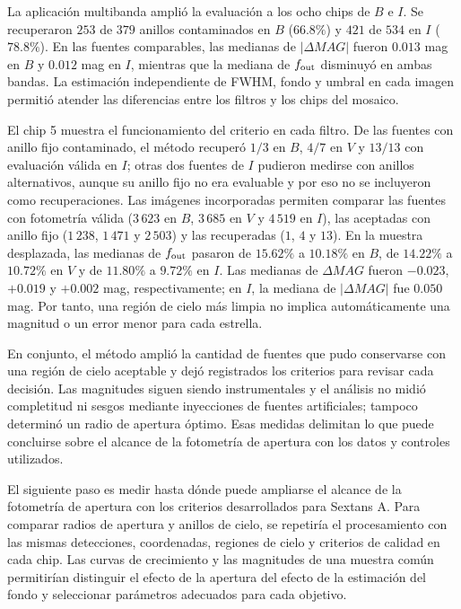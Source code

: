 \documentclass[12pt,letterpaper,oneside]{book}
\begin{document}
La aplicación multibanda amplió la evaluación a los ocho chips de $B$ e $I$. Se recuperaron $253$ de $379$ anillos contaminados en $B$ ($66.8\%$) y $421$ de $534$ en $I$ ($78.8\%$). En las fuentes comparables, las medianas de $|\Delta MAG|$ fueron $0.013$ mag en $B$ y $0.012$ mag en $I$, mientras que la mediana de $f_{\rm out}$ disminuyó en ambas bandas. La estimación independiente de FWHM, fondo y umbral en cada imagen permitió atender las diferencias entre los filtros y los chips del mosaico.

El chip 5 muestra el funcionamiento del criterio en cada filtro. De las fuentes con anillo fijo contaminado, el método recuperó $1/3$ en $B$, $4/7$ en $V$ y $13/13$ con evaluación válida en $I$; otras dos fuentes de $I$ pudieron medirse con anillos alternativos, aunque su anillo fijo no era evaluable y por eso no se incluyeron como recuperaciones. Las imágenes incorporadas permiten comparar las fuentes con fotometría válida ($3\,623$ en $B$, $3\,685$ en $V$ y $4\,519$ en $I$), las aceptadas con anillo fijo ($1\,238$, $1\,471$ y $2\,503$) y las recuperadas ($1$, $4$ y $13$). En la muestra desplazada, las medianas de $f_{\rm out}$ pasaron de $15.62\%$ a $10.18\%$ en $B$, de $14.22\%$ a $10.72\%$ en $V$ y de $11.80\%$ a $9.72\%$ en $I$. Las medianas de $\Delta MAG$ fueron $-0.023$, $+0.019$ y $+0.002$ mag, respectivamente; en $I$, la mediana de $|\Delta MAG|$ fue $0.050$ mag. Por tanto, una región de cielo más limpia no implica automáticamente una magnitud o un error menor para cada estrella.

En conjunto, el método amplió la cantidad de fuentes que pudo conservarse con una región de cielo aceptable y dejó registrados los criterios para revisar cada decisión. Las magnitudes siguen siendo instrumentales y el análisis no midió completitud ni sesgos mediante inyecciones de fuentes artificiales; tampoco determinó un radio de apertura óptimo. Esas medidas delimitan lo que puede concluirse sobre el alcance de la fotometría de apertura con los datos y controles utilizados.

El siguiente paso es medir hasta dónde puede ampliarse el alcance de la fotometría de apertura con los criterios desarrollados para Sextans A. Para comparar radios de apertura y anillos de cielo, se repetiría el procesamiento con las mismas detecciones, coordenadas, regiones de cielo y criterios de calidad en cada chip. Las curvas de crecimiento y las magnitudes de una muestra común permitirían distinguir el efecto de la apertura del efecto de la estimación del fondo y seleccionar parámetros adecuados para cada objetivo.
\end{document}
